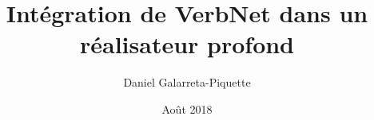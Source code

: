 

\title{Intégration de VerbNet dans un réalisateur profond}
\author{Daniel Galarreta-Piquette}
\date{Août 2018}									%




\maketitle    
 
